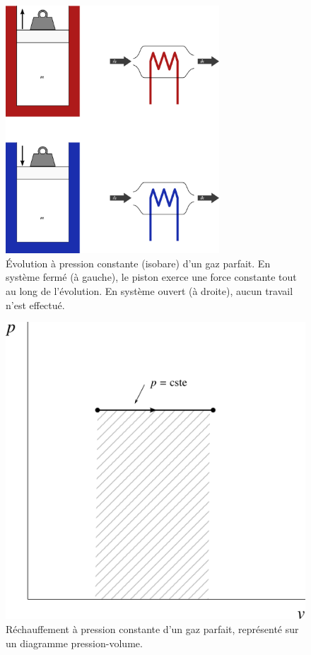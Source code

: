 		\begin{figure}
			\begin{center}
				\includegraphics[width=8cm]{images/pression_constante.png}
			\end{center}
			\caption{Évolution à pression constante (isobare) d’un gaz parfait. En système fermé (à gauche), le piston exerce une force constante tout au long de l’évolution. En système ouvert (à droite), aucun travail n’est effectué.}
			\label{fig_gp_pression_constante}
		\end{figure}
		
		\begin{figure}
			\begin{center}
				\includegraphics[width=\pvdiagramwidth]{images/pv_isobare.png}
			\end{center}
			\caption{Réchauffement à pression constante d’un gaz parfait, représenté sur un diagramme pression-volume.}
			\label{fig_gp_pression_constante_pv}
		\end{figure}		

